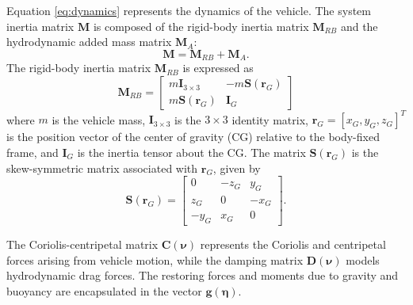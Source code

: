 Equation \eqref{eq:dynamics} represents the dynamics of the vehicle. The system inertia matrix $\mathbf{M}$ is composed of the rigid-body inertia matrix $\mathbf{M}_{RB}$ and the hydrodynamic added mass matrix $\mathbf{M}_A$:
\begin{equation}
    \mathbf{M} = \mathbf{M}_{RB} + \mathbf{M}_A.
\end{equation}
The rigid-body inertia matrix $\mathbf{M}_{RB}$ is expressed as
\begin{equation}
    \mathbf{M}_{RB} =
    \begin{bmatrix}
        m \mathbf{I}_{3\times3} & -m \mathbf{S}(\boldsymbol{r}_G) \\
        m \mathbf{S}(\boldsymbol{r}_G) & \mathbf{I}_G
    \end{bmatrix}
\end{equation}
where $m$ is the vehicle mass, $\mathbf{I}_{3\times3}$ is the $3 \times 3$ identity matrix, $\boldsymbol{r}_G = [x_G, y_G, z_G]^T$ is the position vector of the center of gravity (CG) relative to the body-fixed frame, and $\mathbf{I}_G$ is the inertia tensor about the CG. The matrix $\mathbf{S}(\boldsymbol{r}_G)$ is the skew-symmetric matrix associated with $\boldsymbol{r}_G$, given by
\begin{equation}
    \mathbf{S}(\boldsymbol{r}_G) =
    \begin{bmatrix}
        0 & -z_G & y_G \\
        z_G & 0 & -x_G \\
        -y_G & x_G & 0
    \end{bmatrix}.
\end{equation}


The Coriolis-centripetal matrix $\mathbf{C}(\boldsymbol{\nu})$ represents the Coriolis and centripetal forces arising from vehicle motion, while the damping matrix $\mathbf{D}(\boldsymbol{\nu})$ models hydrodynamic drag forces. The restoring forces and moments due to gravity and buoyancy are encapsulated in the vector $\mathbf{g}(\boldsymbol{\eta})$. 
 
